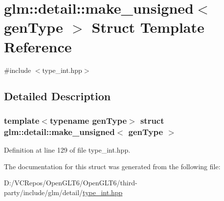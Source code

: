 \hypertarget{structglm_1_1detail_1_1make__unsigned}{}\section{glm\+::detail\+::make\+\_\+unsigned$<$ gen\+Type $>$ Struct Template Reference}
\label{structglm_1_1detail_1_1make__unsigned}


{\ttfamily \#include $<$type\+\_\+int.\+hpp$>$}



\subsection{Detailed Description}
\subsubsection*{template$<$typename gen\+Type$>$\newline
struct glm\+::detail\+::make\+\_\+unsigned$<$ gen\+Type $>$}



Definition at line 129 of file type\+\_\+int.\+hpp.



The documentation for this struct was generated from the following file\+:\begin{DoxyCompactItemize}
\item 
D\+:/\+V\+C\+Repos/\+Open\+G\+L\+T6/\+Open\+G\+L\+T6/third-\/party/include/glm/detail/\mbox{\hyperlink{type__int_8hpp}{type\+\_\+int.\+hpp}}\end{DoxyCompactItemize}
